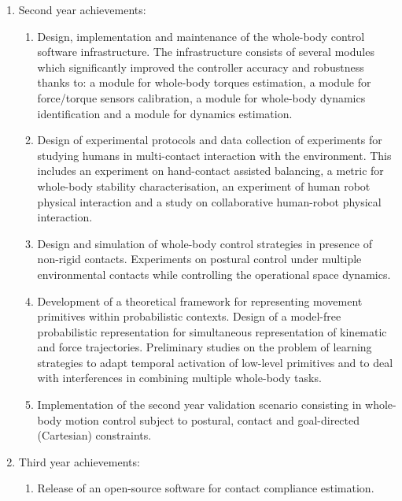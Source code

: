 \documentclass[12pt,a4paper,twoside]{article}
\begin{document}
\begin{enumerate}
\item Second year achievements: 

\begin{enumerate}

\item Design, implementation and maintenance of the whole-body control software infrastructure. The infrastructure consists of several modules which significantly improved the controller accuracy and robustness thanks to: a module for whole-body torques estimation, a module for force/torque sensors calibration, a module for whole-body dynamics identification and a module for dynamics estimation. 

\item Design of experimental protocols and data collection of experiments for studying humans in multi-contact interaction with the environment. This includes an experiment on hand-contact assisted balancing, a metric for whole-body stability characterisation, an experiment of human robot physical interaction and a study on collaborative human-robot physical interaction.

\item Design and simulation of whole-body control strategies in presence of non-rigid contacts. Experiments on postural control under multiple environmental contacts while controlling the operational space dynamics. 

\item Development of a theoretical framework for representing movement primitives within probabilistic contexts. Design of a model-free probabilistic representation for simultaneous representation of kinematic and force trajectories. Preliminary studies on the problem of learning strategies to adapt temporal activation of low-level primitives and to deal with interferences in combining multiple whole-body tasks. 

\item Implementation of the second year validation scenario consisting in whole-body motion control subject to postural, contact and goal-directed (Cartesian) constraints.

\end{enumerate}

\item Third year achievements:

\begin{enumerate}

\item Release of an open-source software for contact compliance estimation.


\end{enumerate}
\end{enumerate}
\end{document}
